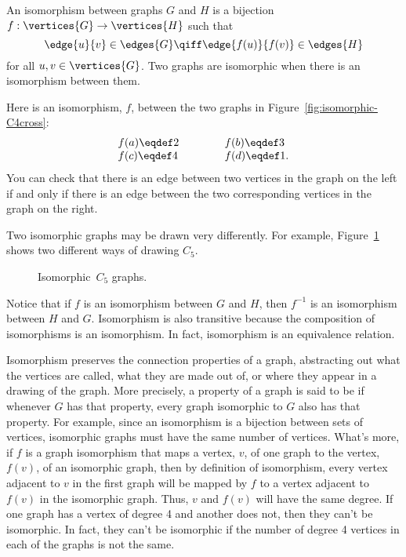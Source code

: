 \begin{definition}\label{simple-isomorphism}
An isomorphism between graphs $G$ and $H$ is a bijection
$f:\vertices{G} \to \vertices{H}$ such that
\[
\edge{u}{v} \in \edges{G} \qiff \edge{f(u)}{f(v)} \in \edges{H}
\]
for all $u, v \in \vertices{G}$.  Two graphs are isomorphic when there
is an isomorphism between them.
\end{definition}

Here is an isomorphism, $f$, between the two graphs in
Figure~\ref{fig:isomorphic-C4cross}:
\[
\begin{array}{lll}
f(a) \eqdef 2 & \hspace{0.3in} & f(b) \eqdef 3 \\
f(c) \eqdef 4 & & f(d) \eqdef 1.
\end{array}
\]
You can check that there is an edge between two vertices in the graph on the left if
and only if there is an edge between the two corresponding vertices in the graph on the
right.

Two isomorphic graphs may be drawn very differently.  For example,
Figure~\ref{fig:isomorphic-C5s} shows two different ways of drawing
$C_5$.
\begin{figure}


\caption{Isomorphic~$C_5$ graphs.}
\label{fig:isomorphic-C5s}
\end{figure}

Notice that if $f$ is an isomorphism between $G$ and $H$, then
$f^{-1}$ is an isomorphism between $H$ and $G$.  Isomorphism is also
transitive because the composition of isomorphisms is an isomorphism.
In fact, isomorphism is an equivalence relation.

Isomorphism preserves the connection properties of a graph,
abstracting out what the vertices are called, what they are made out
of, or where they appear in a drawing of the graph.  More precisely, a
property of a graph is said to be 
if whenever $G$ has that property, every graph isomorphic to $G$ also
has that property.  For example, since an isomorphism is a bijection
between sets of vertices, isomorphic graphs must have the same number
of vertices.  What's more, if $f$ is a graph isomorphism that maps a
vertex, $v$, of one graph to the vertex, $f(v)$, of an isomorphic
graph, then by definition of isomorphism, every vertex adjacent to $v$
in the first graph will be mapped by $f$ to a vertex adjacent to
$f(v)$ in the isomorphic graph.  Thus, $v$ and $f(v)$ will have the
same degree.  If one graph has a vertex of degree 4 and another
does not, then they can't be isomorphic.  In fact, they can't be
isomorphic if the number of degree 4 vertices in each of the graphs is
not the same.

